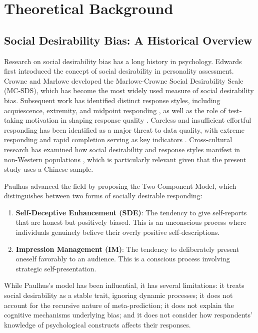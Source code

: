 \documentclass[10pt,twocolumn]{article}
\begin{document}
\section{Theoretical Background}

\subsection{Social Desirability Bias: A Historical Overview}

Research on social desirability bias has a long history in psychology. Edwards \citep{Edwards1953} first introduced the concept of social desirability in personality assessment. Crowne and Marlowe \citep{CrowneMarlowe1960} developed the Marlowe-Crowne Social Desirability Scale (MC-SDS), which has become the most widely used measure of social desirability bias. Subsequent work has identified distinct response styles, including acquiescence, extremity, and midpoint responding \citep{Baumgartner2001, Weijters2010}, as well as the role of test-taking motivation in shaping response quality \citep{Krosnick1991, Wise2006}. Careless and insufficient effortful responding has been identified as a major threat to data quality, with extreme responding and rapid completion serving as key indicators \citep{Meade2012}. Cross-cultural research has examined how social desirability and response styles manifest in non-Western populations \citep{Huang2012}, which is particularly relevant given that the present study uses a Chinese sample.

Paulhus \citep{Paulhus1984} advanced the field by proposing the Two-Component Model, which distinguishes between two forms of socially desirable responding:

\begin{enumerate}
    \item \textbf{Self-Deceptive Enhancement (SDE)}: The tendency to give self-reports that are honest but positively biased. This is an unconscious process where individuals genuinely believe their overly positive self-descriptions.
    \item \textbf{Impression Management (IM)}: The tendency to deliberately present oneself favorably to an audience. This is a conscious process involving strategic self-presentation.
\end{enumerate}

While Paulhus's model has been influential, it has several limitations: it treats social desirability as a stable trait, ignoring dynamic processes; it does not account for the recursive nature of meta-prediction; it does not explain the cognitive mechanisms underlying bias; and it does not consider how respondents' knowledge of psychological constructs affects their responses.
\end{document}
